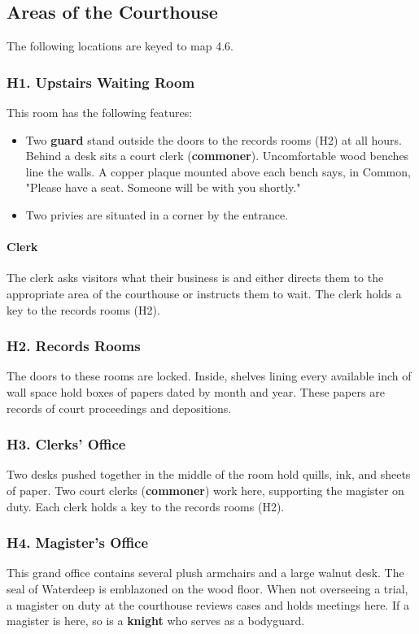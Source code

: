 \documentclass[10pt,a4paper,twoside,twocolumn,openany,nodeprecatedcode]{dndbook}
\begin{document}
\subsection{Areas of the Courthouse}
The following locations are keyed to map 4.6.
\subsubsection{H1. Upstairs Waiting Room}
This room has the following features:
\begin{itemize}

\item Two \textbf{guard} stand outside the doors to the records rooms (H2) at all hours. Behind a desk sits a court clerk (\textbf{commoner}). Uncomfortable wood benches line the walls. A copper plaque mounted above each bench says, in Common, "Please have a seat. Someone will be with you shortly."
\item Two privies are situated in a corner by the entrance.
\end{itemize}


\paragraph{Clerk}
The clerk asks visitors what their business is and either directs them to the appropriate area of the courthouse or instructs them to wait. The clerk holds a key to the records rooms (H2).
\subsubsection{H2. Records Rooms}
The doors to these rooms are locked. Inside, shelves lining every available inch of wall space hold boxes of papers dated by month and year. These papers are records of court proceedings and depositions.
\subsubsection{H3. Clerks' Office}
Two desks pushed together in the middle of the room hold quills, ink, and sheets of paper. Two court clerks (\textbf{commoner}) work here, supporting the magister on duty. Each clerk holds a key to the records rooms (H2).
\subsubsection{H4. Magister's Office}
This grand office contains several plush armchairs and a large walnut desk. The seal of Waterdeep is emblazoned on the wood floor.
When not overseeing a trial, a magister on duty at the courthouse reviews cases and holds meetings here. If a magister is here, so is a \textbf{knight} who serves as a bodyguard.
\end{document}
